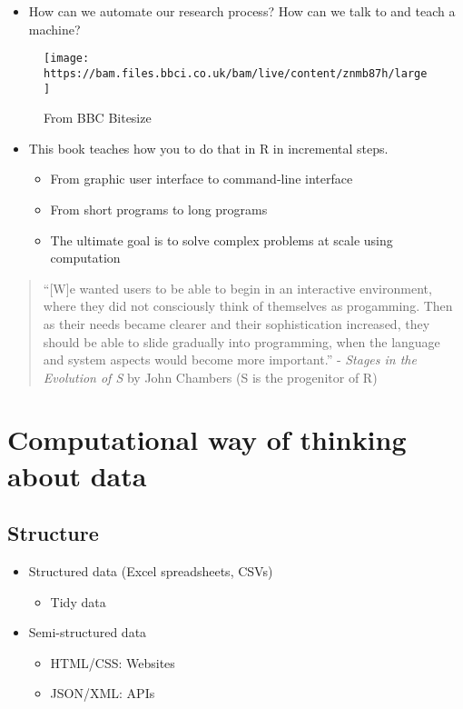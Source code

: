 \documentclass[
]{book}
\providecommand{\tightlist}{%
  \setlength{\itemsep}{0pt}\setlength{\parskip}{0pt}}
\begin{document}
\begin{itemize}
\tightlist
\item
  How can we automate our research process? How can we talk to and teach a machine?
\end{itemize}

\begin{figure}
\centering
\texttt{[image: https://bam.files.bbci.co.uk/bam/live/content/znmb87h/large]}
\caption{From BBC Bitesize}
\end{figure}

\begin{itemize}
\item
  This book teaches how you to do that in R in incremental steps.

  \begin{itemize}
  \tightlist
  \item
    From graphic user interface to command-line interface
  \item
    From short programs to long programs
  \item
    The ultimate goal is to solve complex problems at scale using computation
  \end{itemize}
\end{itemize}

\begin{quote}
``{[}W{]}e wanted users to be able to begin in an interactive environment, where they did not consciously think of themselves as progamming. Then as their needs became clearer and their sophistication increased, they should be able to slide gradually into programming, when the language and system aspects would become more important.'' - \emph{Stages in the Evolution of S} by John Chambers (S is the progenitor of R)
\end{quote}

\hypertarget{computational-way-of-thinking-about-data}{%
\section{Computational way of thinking about data}\label{computational-way-of-thinking-about-data}}

\hypertarget{structure}{%
\subsection{Structure}\label{structure}}

\begin{itemize}
\tightlist
\item
  Structured data (Excel spreadsheets, CSVs)

  \begin{itemize}
  \tightlist
  \item
    Tidy data
  \end{itemize}
\item
  Semi-structured data

  \begin{itemize}
  \tightlist
  \item
    HTML/CSS: Websites
  \item
    JSON/XML: APIs
  \end{itemize}
\end{itemize}
\end{document}
